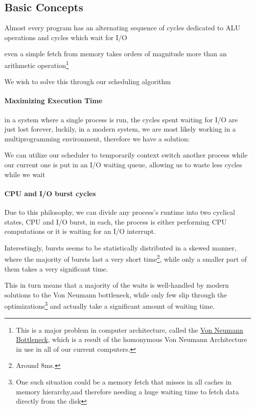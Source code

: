 \documentclass[openright, twoside]{report}
\theoremstyle{definition}
\theoremstyle{example}
\begin{document}
		\subsection{Basic Concepts}
			Almost every program has an alternating sequence of cycles dedicated 
			to ALU operations and cycles which wait for I/O

			even a simple fetch from memory takes orders of magnitude more than an
			arithmetic operation\footnote{This is a major problem in computer architecture, called the 
			\href{https://en.wikipedia.org/wiki/Von_Neumann_architecture\#Von_Neumann_bottleneck}{Von Neumann Bottleneck},
			which is a result of the homonymous Von Neumann Architecture in use in all of our current computers.
			}

			We wish to solve this through our scheduling algorithm 
			
			\paragraph{Maximizing Execution Time}
				in a system where a single process is run, the cycles spent waiting for 
				I/O are just lost forever, luckily, in a modern system, we are most likely 
				working in a multiprogramming environment, therefore we have a solution:

				We can utilize our scheduler to temporarily context switch another process 
				while our current one is put in an I/O waiting queue, allowing us to waste 
				less cycles while we wait

			\paragraph{CPU and I/O burst cycles}
				Due to this philosophy, we can divide any process's runtime into two 
				cyclical states, CPU and I/O burst, in each, the process is either 
				performing CPU computations or it is waiting for an I/O interrupt.

				Interestingly, bursts seems to be statistically distributed in a skewed 
				manner, where the majority of bursts last a very short time\footnote{Around 8ms.},
				while only a smaller part of them takes a very significant time.

				This in turn means that a majority of the waits is well-handled by modern solutions 
				to the Von Neumann bottleneck, while only few slip through the optimizations\footnote{One such situation
				could be a memory fetch that misses in all caches in memory hierarchy,and therefore needing a huge waiting time
				to fetch data directly from the disk} and actually take a significant amount of waiting time.
\end{document}
